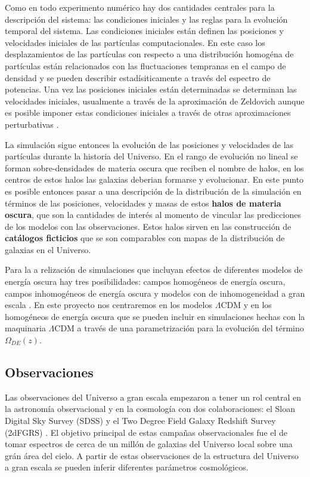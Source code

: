 Como en todo experimento num\'erico
hay dos cantidades centrales para la descripci\'on del sistema: las
condiciones iniciales y las reglas para la evoluci\'on temporal del
sistema.  Las condiciones iniciales est\'an definen las
posiciones y velocidades iniciales de las part\'iculas
computacionales. En este caso los desplazamientos de las part\'iculas
con respecto a una distribuci\'on homog\'ena de part\'iculas est\'an
relacionados con las fluctuaciones tempranas en el campo de densidad y
se pueden describir estad\'isiticamente a trav\'es del espectro de
potencias. Una vez las posiciones iniciales est\'an determinadas se
determinan las velocidades iniciales, usualmente a trav\'es de la
aproximaci\'on de Zeldovich aunque es posible imponer estas
condiciones iniciales a trav\'es de otras aproximaciones perturbativas
\cite{2014MNRAS.439.3630W}. 

La simulaci\'on sigue entonces la evoluci\'on de las posiciones y
velocidades de las part\'iculas durante la historia del
Universo. En el rango de evoluci\'on no lineal se forman
sobre-densidades de materia oscura que reciben el nombre de halos, en
los centros de estos halos las galaxias deberian formarse y
evolucionar. En este punto es posible entonces pasar a una
descripci\'on de la distribuci\'on de la simulaci\'on en t\'erminos de
las posiciones, velocidades y masas de estos {\bf halos de materia
  oscura}, que son la cantidades de inter\'es al momento de vincular
las predicciones de los modelos con las observaciones. Estos halos
sirven en las construcci\'on de {\bf cat\'alogos ficticios} que se
son comparables con mapas de la distribuci\'on de galaxias en el
Universo.

Para la a relizaci\'on de simulaciones  que incluyan
efectos de diferentes modelos de energ\'ia oscura hay tres
posibilidades: campos homog\'eneos de energ\'ia oscura, campos
inhomog\'eneos de energ\'ia oscura y modelos con de inhomogeneidad a
gran escala \cite{2012PDU.....1..162B}. En este proyecto nos
centraremos en los modelos $\Lambda$CDM y en los homog\'eneos de energ\'ia
oscura que se pueden incluir en simulaciones hechas con la maquinaria
$\Lambda$CDM a trav\'es de una parametrizaci\'on para la evoluci\'on
del t\'ermino $\Omega_{DE}(z)$.

\subsection{Observaciones}

Las observaciones del Universo a gran escala empezaron a tener un rol
central en la astronom\'ia observacional y en la cosmolog\'ia con dos
colaboraciones: el Sloan Digital Sky Survey (SDSS) \cite{SDSS} y el Two Degree
Field Galaxy Redshift Survey (2dFGRS) \cite{2dF}. El objetivo
principal de estas campa\~nas observacionales fue el de tomar
espectros de cerca de un mill\'on de galaxias del Universo local sobre
una gr\'an \'area del cielo. A partir de estas observaciones de la
estructura del Universo a gran escala se pueden inferir diferentes
par\'ametros cosmol\'ogicos.

